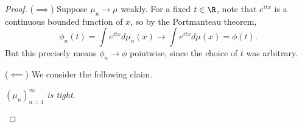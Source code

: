\documentclass[stat901]{subfiles}
\begin{document}
    \begin{proof}
        ($\implies$) Suppose $\mu_n\to\mu$ weakly. For a fixed $t\in\R$, note that $e^{itx}$ is a continuous bounded function of $x$, so by the Portmanteau theorem, 
        \begin{equation*}
            \phi_n\left( t \right) = \int e^{itx}d\mu_n\left( x \right) \to \int e^{itx}d\mu\left( x \right) = \phi\left( t \right).
        \end{equation*}
        But this precisely means $\phi_n\to\phi$ pointwise, since the choice of $t$ was arbitrary.

        ($\impliedby$) We consider the following claim.

        \begin{claim}
            \textit{$\left( \mu_{n} \right)^{\infty}_{n=1}$ is tight.}


\end{claim}
\end{proof}
\end{document}
